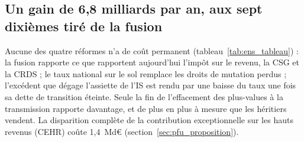 
\subsection{Un gain de 6,8 milliards par an, aux sept dixièmes tiré de la fusion}\label{sec:ens_bilan}

Aucune des quatre réformes n'a de coût permanent (tableau~\ref{tab:ens_tableau}) : la fusion rapporte ce que rapportent
aujourd'hui l'impôt sur le revenu, la CSG et la CRDS ; le taux national sur le sol remplace les droits de mutation
perdus ; l'excédent que dégage l'assiette de l'IS est rendu par une baisse du taux une fois sa dette de transition
éteinte. Seule la fin de l'effacement des plus-values à la transmission rapporte davantage, et de plus en plus à mesure
que les héritiers vendent. La disparition complète de la contribution exceptionnelle sur les hauts revenus (CEHR) coûte
1,4~Md€ (section~\ref{sec:pfu_proposition}).

